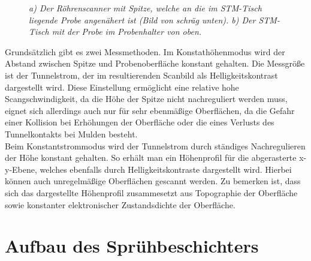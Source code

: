 \begin{figure}[H]
\centering
\sffamily

\caption{\textit{a) Der Röhrenscanner mit Spitze, welche an die im STM-Tisch
liegende Probe angenähert ist (Bild von schräg unten). b) Der STM-Tisch mit der
Probe im Probenhalter von oben.}}
\label{stmaufbau}
\end{figure}

Grundsätzlich gibt es zwei Messmethoden. Im Konstathöhenmodus wird der Abstand zwischen Spitze und
Probenoberfläche konstant gehalten. Die Messgröße ist der Tunnelstrom, der im resultierenden
Scanbild als Helligkeitskontrast dargestellt wird. Diese Einstellung ermöglicht eine relative hohe
Scangschwindigkeit, da die Höhe der Spitze nicht nachreguliert werden muss, eignet sich
allerdings auch nur für sehr ebenmäßige Oberflächen, da die Gefahr einer Kollision bei Erhöhungen
der Oberfläche oder die eines Verlusts des Tunnelkontakts bei Mulden besteht.\\
Beim Konstantstrommodus wird der Tunnelstrom durch ständiges Nachregulieren der Höhe konstant
gehalten. So erhält man ein Höhenprofil für die abgerasterte x-y-Ebene, welches ebenfalls durch
Helligkeitskontraste dargestellt wird. Hierbei können auch unregelmäßige Oberflächen gescannt
werden. Zu bemerken ist, dass sich das dargestellte Höhenprofil zusammesetzt aus Topographie der
Oberfläche sowie konstanter elektronischer Zustandsdichte der Oberfläche.


\section{Aufbau des Sprühbeschichters}
\FloatBarrier

